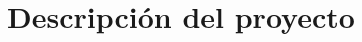 \section{Descripción del proyecto}

\begin{frame}
    \begin{columns}[t]
        \begin{column}{.5\textwidth}
          \tableofcontents[sections={1-2},currentsection]
        \end{column}
        \begin{column}{.5\textwidth}
          \tableofcontents[sections={3-4},currentsection]
        \end{column}
    \end{columns}
\end{frame}

